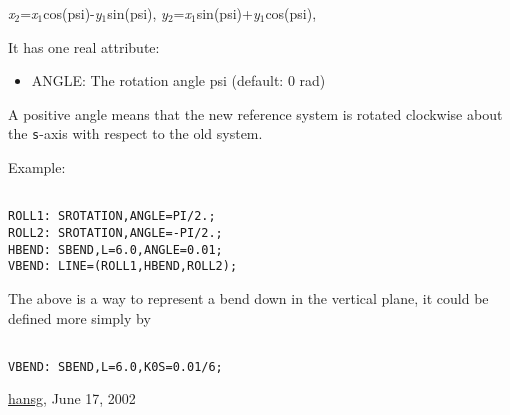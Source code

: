 \textit{x}$_2$=\textit{x}$_1$cos(psi)-\textit{y}$_1$sin(psi), \textit{y}$_2$=\textit{x}$_1$sin(psi)+\textit{y}$_1$cos(psi), 

 It has one real attribute: 
\begin{itemize}
	\item ANGLE: The rotation angle psi (default: 0 rad) 
\end{itemize} A positive angle means that the new reference system is rotated clockwise about the \texttt{s}-axis with respect to the old system. 

 Example: 
\begin{verbatim}

ROLL1: SROTATION,ANGLE=PI/2.;
ROLL2: SROTATION,ANGLE=-PI/2.;
HBEND: SBEND,L=6.0,ANGLE=0.01;
VBEND: LINE=(ROLL1,HBEND,ROLL2);
\end{verbatim} The above is a way to represent a bend down in the vertical plane, it could be defined more simply by 
\begin{verbatim}

VBEND: SBEND,L=6.0,K0S=0.01/6;
\end{verbatim}\href{http://www.cern.ch/Hans.Grote/hansg_sign.html}{hansg}, June 17, 2002 

